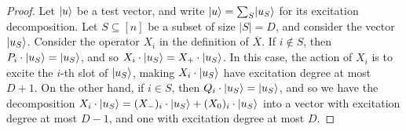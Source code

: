 \documentclass[10pt]{article}
\DeclarePairedDelimiter{\ket}{\lvert}{\rangle}%
\newcommand{\lift}[1]{\overline{#1}}
\begin{document}
\begin{proof}
    Let $\ket{u}$ be a test vector, and write $\ket{u} = \sum_S \ket{u_S}$ for its excitation decomposition. Let $S\subseteq [n]$ be a subset of size $|S| = D$, and consider the vector $\ket{u_S}$.
    Consider the operator $X_i$ in the definition of $\lift{X}$.
    If $i \notin S$, then $P_i \cdot \ket{u_S} = \ket{u_S}$, and so $X_i \cdot \ket{u_S} = X_+ \cdot \ket{u_S}$. In this case, the action of $X_i$ is to excite the $i$-th slot of $\ket{u_S}$, making $X_i \cdot \ket{u_S}$ have excitation degree at most $D + 1$.
    On the other hand, if $i\in S$, then $Q_i \cdot \ket{u_S} = \ket{u_S}$, and so we have the decomposition $X_i\cdot \ket{u_S} = (X_-)_i\cdot \ket{u_S} + (X_0)_i\cdot \ket{u_S}$ into a vector with excitation degree at most $D -1$, and one with excitation degree at most $D$.
    

\end{proof}
\end{document}
